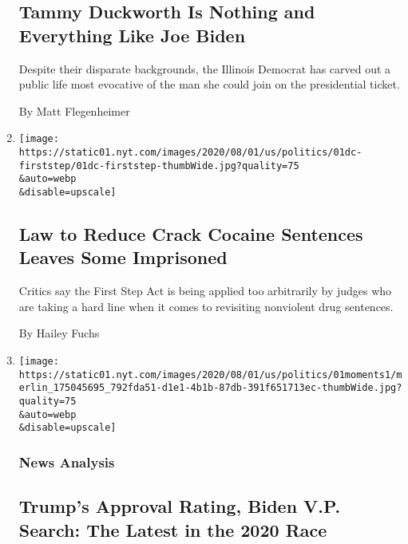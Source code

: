 \begin{enumerate}
{  \subsection{Tammy Duckworth Is Nothing and Everything Like Joe
  Biden}\label{tammy-duckworth-is-nothing-and-everything-like-joe-biden-1}}

  Despite their disparate backgrounds, the Illinois Democrat has carved
  out a public life most evocative of the man she could join on the
  presidential ticket.

  By Matt Flegenheimer
\item
  \href{/2020/08/01/us/politics/law-to-reduce-crack-cocaine-sentences-leaves-some-imprisoned.html}{}

  \texttt{[image: https://static01.nyt.com/images/2020/08/01/us/politics/01dc-firststep/01dc-firststep-thumbWide.jpg?quality=75\\\&auto=webp\\\&disable=upscale]}

  \hypertarget{law-to-reduce-crack-cocaine-sentences-leaves-some-imprisoned}{%
  \subsection{Law to Reduce Crack Cocaine Sentences Leaves Some
  Imprisoned}\label{law-to-reduce-crack-cocaine-sentences-leaves-some-imprisoned}}

  Critics say the First Step Act is being applied too arbitrarily by
  judges who are taking a hard line when it comes to revisiting
  nonviolent drug sentences.

  By Hailey Fuchs
\item
  \href{/2020/08/01/us/politics/trump-biden-polls-vp.html}{}

  \texttt{[image: https://static01.nyt.com/images/2020/08/01/us/politics/01moments1/merlin\_175045695\_792fda51-d1e1-4b1b-87db-391f651713ec-thumbWide.jpg?quality=75\\\&auto=webp\\\&disable=upscale]}

  \hypertarget{news-analysis-2}{%
  \subsubsection{News Analysis}\label{news-analysis-2}}

  \hypertarget{trumps-approval-rating-biden-vp-search-the-latest-in-the-2020-race}{%
  \subsection{Trump's Approval Rating, Biden V.P. Search: The Latest in
  the 2020
  Race}\label{trumps-approval-rating-biden-vp-search-the-latest-in-the-2020-race}}


\end{enumerate}
